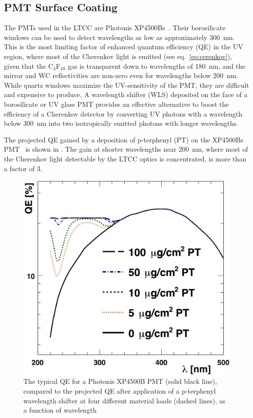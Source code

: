 \subsection{PMT Surface Coating}

The PMTs used in the LTCC are Photonis XP4500Bs~\cite{Photonis:2007ta}. Their borosilicate windows can be used to
detect wavelengths as low as approximately 300~nm. This is the most limiting factor of enhanced quantum efficiency
(QE) in the UV region, where most of the Cherenkov light is emitted (see eq.~\ref{eq:cerenkov}), given that the
C$_4$F$_{10}$ gas is transparent down to wavelengths of 180~nm, and the mirror and WC reflectivities are non-zero
even for wavelengths below 200~nm. While quartz windows maximize the UV-sensitivity of the PMT, they are difficult
and expensive to produce. A wavelength shifter (WLS) deposited on the face of a borosilicate or UV glass PMT provides
an effective alternative to boost the efficiency of a Cherenkov detector by converting UV photons with a wavelength
below 300~nm into two isotropically emitted photons with longer wavelengths.

The projected QE gained by a deposition of p-terphenyl (PT) on the XP4500Bs PMT~\cite{Koczon:1457653} is shown
in . The gain at shorter wavelengths near 200~nm, where most of the
Cherenkov light detectable by the LTCC optics is concentrated, is more than a factor of 3.

\begin{figure}
	\centering
	\includegraphics[width=0.99\columnwidth, height=0.75\columnwidth]{img/pmtQuantumEfficiencyGain.png}
	\caption{The typical QE for a Photonis XP4500B PMT (solid black line), compared to the projected QE after
          application of a p-terphenyl wavelength shifter at four different material loads (dashed lines), as a function
          of wavelength}
	\label{fig:pmtQuantumEfficiencyGainAndExample}
\end{figure}


